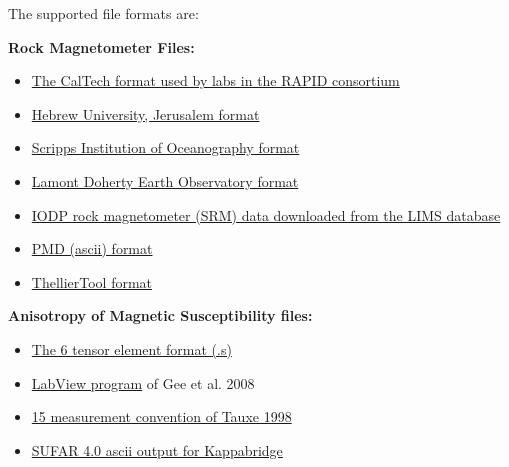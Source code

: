 \documentclass[11pt]{book}
\begin{document}
{The supported file formats are:

{\bf Rock Magnetometer Files:}

\begin{itemize}
\item \href{#CIT_magic.py}{The CalTech format used by labs in the RAPID consortium}
\item \href{#HUJI_magic.py}{Hebrew University, Jerusalem format}
\item \href{#sio_magic.py}{Scripps Institution of Oceanography format}
\item \href{#LDEO_magic.py}{Lamont Doherty Earth Observatory format}
\item \href{#IODP_csv_magic.py}{IODP rock magnetometer (SRM) data downloaded from the LIMS database}
\item \href{#PMD_magic.py}{PMD (ascii) format}
\item \href{#TDT_magic.py}{ThellierTool format}
\end{itemize}


{\bf Anisotropy of Magnetic Susceptibility files:}

\begin{itemize}
\item \href{#s_magic.py}{The 6 tensor element format (.s)}
\item \href{#KLY4S_magic.py}{LabView program} of Gee et al. 2008 \nocite{gee08}
\item \href{#k15\_magic.py}{15 measurement convention of Tauxe 1998 \nocite{tauxe98}}
\item \href{#SUFAR4-asc\_magic.py}{SUFAR 4.0 ascii output for Kappabridge}
\end{itemize}

}
\end{document}
